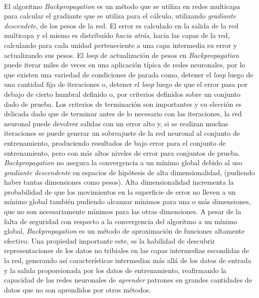 \paragraph{}El algoritmo \textit{Backpropagation} es un método que se utiliza en redes multicapa para calcular el gradiante que se utiliza para el cálculo, utilizando \textit{gradiante descendete}, de los pesos de la red. El error es calculado en la salida de la red multicapa y el mismo es distribuído \textit{hacia atrás}, hacia las capas de la red, calculando para cada unidad perteneciente a una capa intermedia su error y actualizando sus pesos. El \textit{loop} de actualización de pesos en \textit{Backpropagation} puede iterar miles de veces en una aplicación típica de redes neuronales, por lo que existen una variedad de condiciones de parada como, detener el \textit{loop} luego de una cantidad fija de iteraciones o, detener el \textit{loop} luego de que el error pasa por debajo de cierto humbral definido o, por criterios definidos sobre un conjunto dado de prueba. Los criterios de terminación son importantes y su elección es delicada dado que de terminar antes de lo necesario con las iteraciones, la red neuronal puede devolver salidas con un error alto y, si se realizan muchas iteraciones se puede generar un sobreajuste de la red neuronal al conjunto de entrenamiento, produciendo resultados de bajo error para el conjunto de entrenamiento, pero con más altos niveles de error para conjuntos de prueba. \textit{Backpropagation} no asegura la convergencia a un mínimo global debido al uso \textit{gradiante descendente} en espacios de hipótesis de alta dimensionalidad, (pudiendo haber tantas dimensiones como pesos). Alta dimensionalidad incrementa la probabilidad de que los movimientos en la superficie de error no lleven a un mínimo global también pudiendo alcanzar mínimos para una o más dimensiones, que no son necesariamente mínimos para las otras dimensiones. A pesar de la falta de seguridad con respecto a la convergencia del algoritmo a un mínimo global, \textit{Backpropagation} es un método de aproximación de funciones altamente efectivo. Una propiedad importante este, es la habilidad de descubrir representaciones de los datos no tribiales en las capas intermedias escondidas de la red, generando así características intermedias más allá de los datos de entrada y la salida proporsionada por los datos de entrenamiento, reafirmando la capacidad de las redes neuronales de \textit{aprender} patrones en grandes cantidades de datos que no son aprendidos por otros métodos. 

